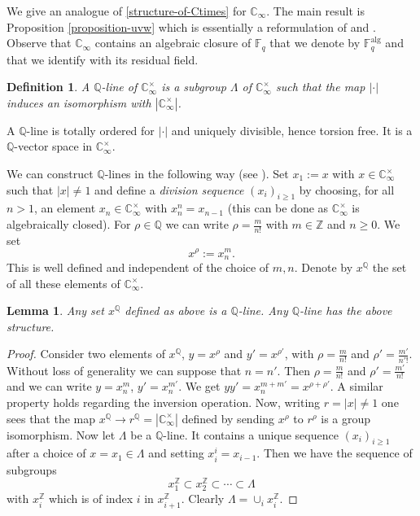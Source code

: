 \documentclass[11pt]{amsart}
\numberwithin{equation}{section}
\newcommand{\ZZ}{\mathbb{Z}}
\newcommand{\FF}{\mathbb{F}}
\newcommand{\CC}{\mathbb{C}}
\newcommand{\QQ}{\mathbb{Q}}
\newtheorem{Lemma}[Theorem]{Lemma}
\newtheorem{Definition}[Theorem]{Definition}
\begin{document}
We give an analogue of \eqref{structure-of-Ctimes} for $\CC_\infty$. The main result is Proposition \ref{proposition-uvw} which is 
essentially a reformulation of \cite[Lemma 4.2.10]{PEL5} and \cite[\S 1]{ANG&NGO&TAV}. Observe that $\CC_\infty$ contains an algebraic closure of
$\FF_q$ that we denote by $\FF_q^{\text{alg}}$ and that we identify with its residual field. 

\begin{Definition}
{\em A {\em $\QQ$-line} of $\CC_\infty^\times$ is a subgroup $\Lambda$ of $\CC_\infty^\times$ such that the map $|\cdot|$ induces an isomorphism with $|\CC_\infty^\times|$.}
\end{Definition}

A $\QQ$-line is totally ordered for $|\cdot|$ and uniquely divisible, hence torsion free. It is a $\QQ$-vector space in $\CC_\infty^\times$. 

We can construct $\QQ$-lines in the following way (see \cite[\S 1]{ANG&NGO&TAV}).
Set $x_1:=x$ with $x\in\CC_\infty^\times$ such that $|x|\neq 1$ and define a {\em division sequence} $(x_i)_{i\geq 1}$ by choosing, for all $n>1$, an element $x_n\in\CC_\infty^\times$ with $x_n^n=x_{n-1}$ (this can be done as $\CC_\infty^\times$ is algebraically closed). For $\rho\in\QQ$ we can write $\rho=\frac{m}{n!}$
with $m\in\ZZ$ and $n\geq 0$. We set $$x^\rho:=x_n^m.$$ 
This is well defined and independent of the choice of $m,n$.
Denote by $x^\QQ$ the set of all these elements of $\CC_\infty^\times$.

\begin{Lemma}
Any set $x^\QQ$ defined as above is a $\QQ$-line. Any $\QQ$-line has the above structure.
\end{Lemma}

\begin{proof}
 Consider two elements of $x^\QQ$, $y=x^\rho$ and $y'=x^{\rho'}$, with $\rho=\frac{m}{n!}$ and $\rho'=\frac{m'}{n'!}$. Without loss of generality we can suppose that $n=n'$. Then $\rho=\frac{m}{n!}$ and $\rho'=\frac{m'}{n!}$ and we can write
 $y=x_n^m$, $y'=x_n^{m'}$. We get $yy'=x_n^{m+m'}=x^{\rho+\rho'}$. A similar property holds regarding the inversion operation. Now, writing
 $r=|x|\neq 1$ one sees that the map $x^\QQ\rightarrow r^\QQ=|\CC_\infty^\times|$ defined by sending $x^\rho$ to $r^\rho$
 is a group isomorphism. Now let $\Lambda$ be a $\QQ$-line. It contains a unique sequence 
 $(x_i)_{i\geq 1}$ after a choice of $x=x_1\in\Lambda$ and setting $x_i^i=x_{i-1}$.
 Then we have the sequence of subgroups
 $$x_1^\ZZ\subset x_2^\ZZ\subset\cdots\subset\Lambda$$
 with $x_i^\ZZ$ which is of index $i$ in $x_{i+1}^\ZZ$. Clearly $\Lambda=\cup_ix_i^\ZZ$.
  \end{proof}
 
\end{document}
